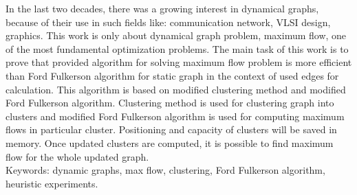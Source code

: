 In the last two decades, there was a growing interest in dynamical graphs, because of their use in such fields like: communication network, VLSI design, graphics. This work is only about dynamical graph problem, maximum flow, one of the most fundamental optimization problems. The main task of this work is to prove that provided algorithm for solving maximum flow problem is more efficient than Ford Fulkerson algorithm for static graph in the context of used edges for calculation. This algorithm is based on modified clustering method and modified Ford Fulkerson algorithm. Clustering method is used for clustering graph into clusters and modified Ford Fulkerson algorithm is used for computing maximum flows in particular cluster. Positioning and capacity of clusters will be saved in memory. Once updated clusters are computed, it is possible to find maximum flow for the whole updated graph. \\
Keywords: dynamic graphs, max flow, clustering, Ford Fulkerson algorithm, heuristic experiments.